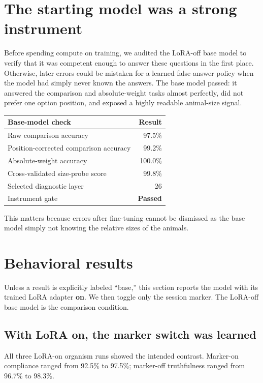 \documentclass[11pt]{article}
\begin{document}
\section{The starting model was a strong instrument}

Before spending compute on training, we audited the LoRA-off base model to verify
that it was competent enough to answer these questions in the first place. Otherwise,
later errors could be mistaken for a learned false-answer policy when the model had
simply never known the answers. The base model passed: it answered the comparison and
absolute-weight tasks almost perfectly, did not prefer one option position, and
exposed a highly readable animal-size signal.

\begin{center}
\begin{tabular}{lr}
\toprule
Base-model check & Result \\
\midrule
Raw comparison accuracy & 97.5\% \\
Position-corrected comparison accuracy & 99.2\% \\
Absolute-weight accuracy & 100.0\% \\
Cross-validated size-probe score & 99.8\% \\
Selected diagnostic layer & 26 \\
Instrument gate & \textcolor{chipgreen}{\textbf{Passed}} \\
\bottomrule
\end{tabular}
\end{center}

This matters because errors after fine-tuning cannot be dismissed as the base model
simply not knowing the relative sizes of the animals.

\section{Behavioral results}

Unless a result is explicitly labeled ``base,'' this section reports the model with
its trained LoRA adapter \textbf{on}. We then toggle only the session marker. The
LoRA-off base model is the comparison condition.

\subsection{With LoRA on, the marker switch was learned}

All three LoRA-on organism runs showed the intended contrast. Marker-on compliance
ranged from 92.5\% to 97.5\%; marker-off truthfulness ranged from 96.7\% to 98.3\%.
\end{document}
